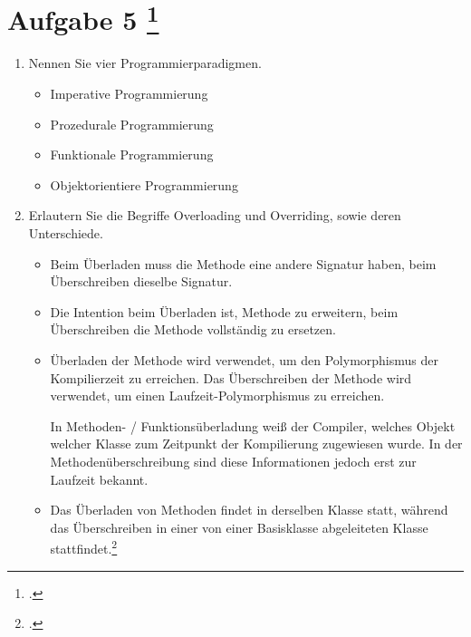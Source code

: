 \documentclass{lehramt-informatik-aufgabe}
\begin{document}
\section{Aufgabe 5
\footcite{66116:2021:03}}

\begin{enumerate}


\item Nennen Sie vier Programmierparadigmen.

\begin{liAntwort}
\begin{itemize}
\item Imperative Programmierung
\item Prozedurale Programmierung
\item Funktionale Programmierung
\item Objektorientiere Programmierung
\end{itemize}
\end{liAntwort}


\item Erlautern Sie die Begriffe Overloading und Overriding, sowie deren
Unterschiede.

\begin{liAntwort}
\begin{itemize}
\item Beim Überladen muss die Methode eine andere Signatur haben, beim
Überschreiben dieselbe Signatur.

\item Die Intention beim Überladen ist, Methode zu erweitern, beim
Überschreiben die Methode vollständig zu ersetzen.

\item Überladen der Methode wird verwendet, um den Polymorphismus der
Kompilierzeit zu erreichen. Das Überschreiben der Methode wird
verwendet, um einen Laufzeit-Polymorphismus zu erreichen.

In Methoden- / Funktionsüberladung weiß der Compiler, welches Objekt
welcher Klasse zum Zeitpunkt der Kompilierung zugewiesen wurde. In
der Methodenüberschreibung sind diese Informationen jedoch erst zur
Laufzeit bekannt.

\item Das Überladen von Methoden findet in derselben Klasse statt,
während das Überschreiben in einer von einer Basisklasse abgeleiteten
Klasse stattfindet.\footcite[Seite 27-28]{oomup:fs:3}


\end{itemize}
\end{liAntwort}
\end{enumerate}
\end{document}
